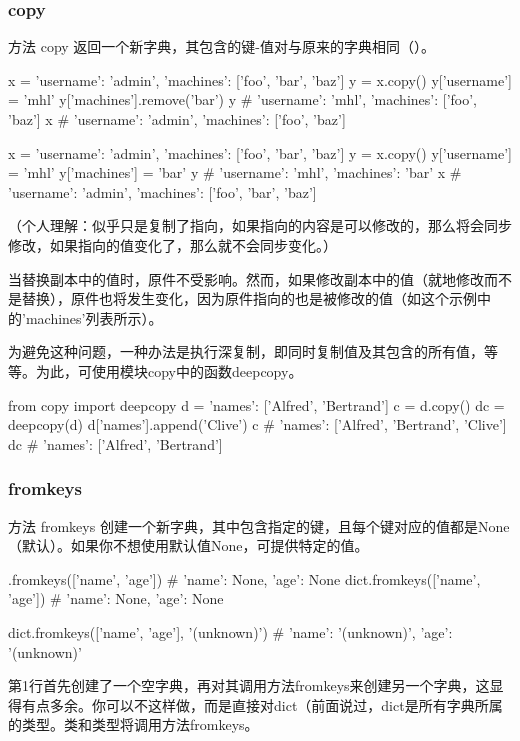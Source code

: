 \subsubsection{copy}
方法 copy 返回一个新字典，其包含的键-值对与原来的字典相同（）。

\begin{pyc}
x = {'username': 'admin', 'machines': ['foo', 'bar', 'baz']}
y = x.copy()
y['username'] = 'mhl'
y['machines'].remove('bar')
y  # {'username': 'mhl', 'machines': ['foo', 'baz']}
x  # {'username': 'admin', 'machines': ['foo', 'baz']}

x = {'username': 'admin', 'machines': ['foo', 'bar', 'baz']}
y = x.copy()
y['username'] = 'mhl'
y['machines'] = 'bar'
y  # {'username': 'mhl', 'machines': 'bar'}
x  # {'username': 'admin', 'machines': ['foo', 'bar', 'baz']}
\end{pyc}

（个人理解：似乎只是复制了指向，如果指向的内容是可以修改的，那么将会同步修改，如果指向的值变化了，那么就不会同步变化。）

当替换副本中的值时，原件不受影响。然而，如果修改副本中的值（就地修改而不是替换），原件也将发生变化，因为原件指向的也是被修改的值（如这个示例中的'machines'列表所示）。

为避免这种问题，一种办法是执行深复制，即同时复制值及其包含的所有值，等等。为此，可使用模块copy中的函数deepcopy。
\begin{pyc}
from copy import deepcopy
d = {'names': ['Alfred', 'Bertrand']}
c = d.copy()
dc = deepcopy(d)
d['names'].append('Clive')
c  # {'names': ['Alfred', 'Bertrand', 'Clive']}
dc  # {'names': ['Alfred', 'Bertrand']}
\end{pyc}

\subsubsection{fromkeys}
方法 fromkeys 创建一个新字典，其中包含指定的键，且每个键对应的值都是None（默认）。如果你不想使用默认值None，可提供特定的值。
\begin{pyc}
{}.fromkeys(['name', 'age'])  # {'name': None, 'age': None}
dict.fromkeys(['name', 'age'])  # {'name': None, 'age': None}

dict.fromkeys(['name', 'age'], '(unknown)')
# {'name': '(unknown)', 'age': '(unknown)'}
\end{pyc}

第1行首先创建了一个空字典，再对其调用方法fromkeys来创建另一个字典，这显得有点多余。你可以不这样做，而是直接对dict（前面说过，dict是所有字典所属的类型。类和类型将调用方法fromkeys。
